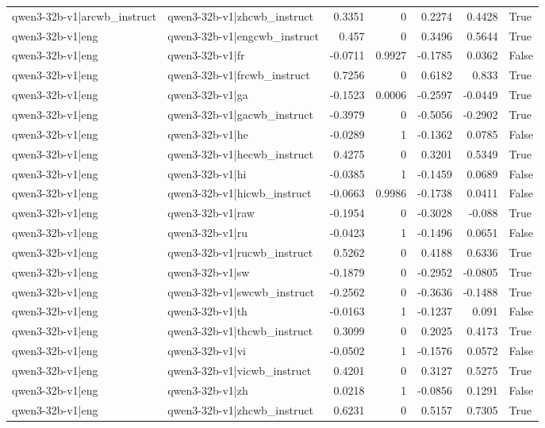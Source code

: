 \begin{table}
\begin{tabular}{l l r r r r l}
qwen3-32b-v1|arcwb_instruct & qwen3-32b-v1|zhcwb_instruct & 0.3351 & 0 & 0.2274 & 0.4428 & True \\
qwen3-32b-v1|eng & qwen3-32b-v1|engcwb_instruct & 0.457 & 0 & 0.3496 & 0.5644 & True \\
qwen3-32b-v1|eng & qwen3-32b-v1|fr & -0.0711 & 0.9927 & -0.1785 & 0.0362 & False \\
qwen3-32b-v1|eng & qwen3-32b-v1|frcwb_instruct & 0.7256 & 0 & 0.6182 & 0.833 & True \\
qwen3-32b-v1|eng & qwen3-32b-v1|ga & -0.1523 & 0.0006 & -0.2597 & -0.0449 & True \\
qwen3-32b-v1|eng & qwen3-32b-v1|gacwb_instruct & -0.3979 & 0 & -0.5056 & -0.2902 & True \\
qwen3-32b-v1|eng & qwen3-32b-v1|he & -0.0289 & 1 & -0.1362 & 0.0785 & False \\
qwen3-32b-v1|eng & qwen3-32b-v1|hecwb_instruct & 0.4275 & 0 & 0.3201 & 0.5349 & True \\
qwen3-32b-v1|eng & qwen3-32b-v1|hi & -0.0385 & 1 & -0.1459 & 0.0689 & False \\
qwen3-32b-v1|eng & qwen3-32b-v1|hicwb_instruct & -0.0663 & 0.9986 & -0.1738 & 0.0411 & False \\
qwen3-32b-v1|eng & qwen3-32b-v1|raw & -0.1954 & 0 & -0.3028 & -0.088 & True \\
qwen3-32b-v1|eng & qwen3-32b-v1|ru & -0.0423 & 1 & -0.1496 & 0.0651 & False \\
qwen3-32b-v1|eng & qwen3-32b-v1|rucwb_instruct & 0.5262 & 0 & 0.4188 & 0.6336 & True \\
qwen3-32b-v1|eng & qwen3-32b-v1|sw & -0.1879 & 0 & -0.2952 & -0.0805 & True \\
qwen3-32b-v1|eng & qwen3-32b-v1|swcwb_instruct & -0.2562 & 0 & -0.3636 & -0.1488 & True \\
qwen3-32b-v1|eng & qwen3-32b-v1|th & -0.0163 & 1 & -0.1237 & 0.091 & False \\
qwen3-32b-v1|eng & qwen3-32b-v1|thcwb_instruct & 0.3099 & 0 & 0.2025 & 0.4173 & True \\
qwen3-32b-v1|eng & qwen3-32b-v1|vi & -0.0502 & 1 & -0.1576 & 0.0572 & False \\
qwen3-32b-v1|eng & qwen3-32b-v1|vicwb_instruct & 0.4201 & 0 & 0.3127 & 0.5275 & True \\
qwen3-32b-v1|eng & qwen3-32b-v1|zh & 0.0218 & 1 & -0.0856 & 0.1291 & False \\
qwen3-32b-v1|eng & qwen3-32b-v1|zhcwb_instruct & 0.6231 & 0 & 0.5157 & 0.7305 & True \\

\end{tabular}
\end{table}
